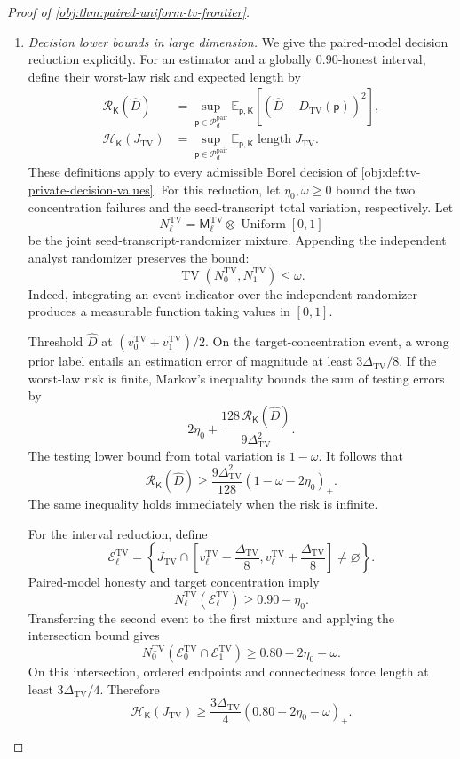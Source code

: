 \documentclass[11pt]{article}
\begin{document}
\begin{proof}[Proof of \cref{obj:thm:paired-uniform-tv-frontier}]
\begin{enumerate}
\item \textit{Decision lower bounds in large dimension.}
We give the paired-model decision reduction explicitly.
For an estimator and a globally \(0.90\)-honest interval, define their worst-law risk and expected length by
\[
\begin{aligned}
\mathcal R_{\mathsf K}(\widehat D)
&=\sup_{\mathsf p\in\mathcal P_d^{\mathrm{pair}}}
\mathbb E_{\mathsf p,\mathsf K}
\left[(\widehat D-D_{\mathrm{TV}}(\mathsf p))^2\right],\\
\mathcal H_{\mathsf K}(J_{\mathrm{TV}})
&=\sup_{\mathsf p\in\mathcal P_d^{\mathrm{pair}}}
\mathbb E_{\mathsf p,\mathsf K}\operatorname{length}J_{\mathrm{TV}}.
\end{aligned}
\]
These definitions apply to every admissible Borel decision of \cref{obj:def:tv-private-decision-values}.
For this reduction, let \(\eta_0,\omega\ge0\) bound the two concentration failures and the seed-transcript total variation, respectively.
Let
\[
N_\ell^{\mathrm{TV}}
=\mathsf M_\ell^{\mathrm{TV}}\otimes\operatorname{Uniform}[0,1]
\]
be the joint seed-transcript-randomizer mixture.
Appending the independent analyst randomizer preserves the bound:
\[
\operatorname{TV}(N_0^{\mathrm{TV}},N_1^{\mathrm{TV}})\le\omega.
\]
Indeed, integrating an event indicator over the independent randomizer produces a measurable function taking values in \([0,1]\).

Threshold \(\widehat D\) at
\((v_0^{\mathrm{TV}}+v_1^{\mathrm{TV}})/2\).
On the target-concentration event, a wrong prior label entails an estimation error of magnitude at least \(3\Delta_{\mathrm{TV}}/8\).
If the worst-law risk is finite, Markov's inequality bounds the sum of testing errors by
\[
2\eta_0+
\frac{128\,\mathcal R_{\mathsf K}(\widehat D)}
{9\Delta_{\mathrm{TV}}^2}.
\]
The testing lower bound from total variation is \(1-\omega\). It follows that
\[
\mathcal R_{\mathsf K}(\widehat D)
\ge
\frac{9\Delta_{\mathrm{TV}}^2}{128}
(1-\omega-2\eta_0)_+.
\]
The same inequality holds immediately when the risk is infinite.

For the interval reduction, define
\[
\mathcal E_\ell^{\mathrm{TV}}
=
\left\{
J_{\mathrm{TV}}\cap
\left[v_\ell^{\mathrm{TV}}-\frac{\Delta_{\mathrm{TV}}}{8},
      v_\ell^{\mathrm{TV}}+\frac{\Delta_{\mathrm{TV}}}{8}\right]
\ne\varnothing
\right\}.
\]
Paired-model honesty and target concentration imply
\[
N_\ell^{\mathrm{TV}}(\mathcal E_\ell^{\mathrm{TV}})
\ge0.90-\eta_0.
\]
Transferring the second event to the first mixture and applying the intersection bound gives
\[
N_0^{\mathrm{TV}}
(\mathcal E_0^{\mathrm{TV}}\cap\mathcal E_1^{\mathrm{TV}})
\ge0.80-2\eta_0-\omega.
\]
On this intersection, ordered endpoints and connectedness force length at least \(3\Delta_{\mathrm{TV}}/4\). Therefore
\[
\mathcal H_{\mathsf K}(J_{\mathrm{TV}})
\ge
\frac{3\Delta_{\mathrm{TV}}}{4}
(0.80-2\eta_0-\omega)_+.
\]


\end{enumerate}
\end{proof}
\end{document}
